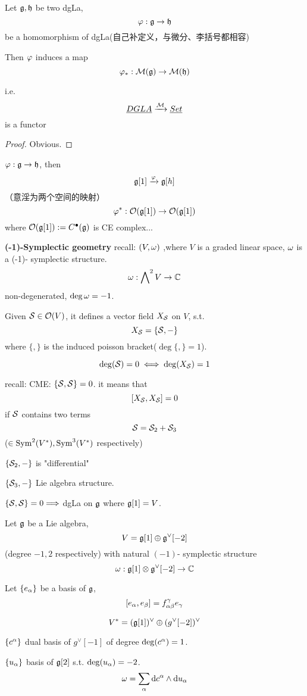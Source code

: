 \begin{prop}
Let $\mathfrak{g},\mathfrak{h}$ be two dgLa,
$$\varphi:\mathfrak{g}\to\mathfrak{h}$$
be a homomorphism of dgLa(自己补定义，与微分、李括号都相容)

Then $\varphi$ induces a map
$$\varphi_*: \mathcal{M}(\mathfrak{g})\to\mathcal{M}(\mathfrak{h})$$

i.e.
$$\underline{DGLA}\xrightarrow{\mathcal{M}}\underline{Set}$$
is a functor
\end{prop}

\begin{proof}
Obvious.
\end{proof}

$\varphi:\mathfrak{g}\to\mathfrak{h}$, then
$$\mathfrak{g}[1]\xrightarrow{\varphi}\mathfrak{g}[h]$$
（意淫为两个空间的映射）
$$\varphi^*:\mathcal{O}(\mathfrak{g}[1])\to\mathcal{O}(\mathfrak{g}[1])$$
where $\mathcal{O}(\mathfrak{g}[1]):=C^{\bullet}(\mathfrak{g})$ is CE complex...

\textbf{(-1)-Symplectic geometry}
recall: $(V,\omega)$ ,where $V$ is a graded linear space, $\omega$ is a (-1)- symplectic structure.
$$\omega:\bigwedge\nolimits^{2}V\to\mathbb{C}$$
non-degenerated, $\deg\omega=-1$.

Given $\mathcal{S}\in\mathcal{O}(V)$, it defines a vector field
$X_{\mathcal{S}}$ on $V$, s.t.
$$X_{\mathcal{S}}=\{\mathcal{S},-\}$$
where $\{,\}$ is the induced poisson bracket($\deg\{,\}=1$).

$$\deg(\mathcal{S})=0\iff\deg(X_{\mathcal{S}})=1$$

recall: CME: $\{\mathcal{S},\mathcal{S}\}=0$. it means that
$$[X_{\mathcal{S}},X_{\mathcal{S}}]=0$$
if $\mathcal{S}$ contains two terms
$$\mathcal{S}=\mathcal{S}_2+\mathcal{S}_3$$
($\in \operatorname{Sym}^2(V^*),\operatorname{Sym}^3(V^*)$ respectively)

$\{\mathcal{S}_2,-\}$ is "differential"

$\{\mathcal{S}_3,-\}$ Lie algebra structure.

$\{\mathcal{S},\mathcal{S}\}=0\Longrightarrow$ dgLa on $\mathfrak{g}$ where $\mathfrak{g}[1]=V$.

\begin{example}
Let $\mathfrak{g}$ be a Lie algebra,
$$V=\mathfrak{g}[1]\oplus\mathfrak{g}^\vee[-2]$$
(degree $-1,2$ respectively)
with natural $(-1)$- symplectic structure
$$\omega:\mathfrak{g}[1]\otimes \mathfrak{g}^\vee[-2]\to\mathbb{C}$$


Let $\{e_\alpha\}$ be a basis of $\mathfrak{g}$,
$$[e_\alpha,e_\beta]=f^\gamma_{\alpha\beta}e_\gamma$$

$$V^*=(\mathfrak{g}[1])^\vee\oplus(g^\vee[-2])^\vee$$

$\{c^\alpha\}$ dual basis of $g^\vee[-1]$ of degree $\deg(c^\alpha)=1$.

$\{u_\alpha\}$ basis of $\mathfrak{g}[2]$ s.t. $\deg(u_\alpha)=-2$.
$$\omega=\sum_{\alpha}\mathrm{d} c^\alpha\wedge\mathrm{d} u_\alpha$$
\end{example}


